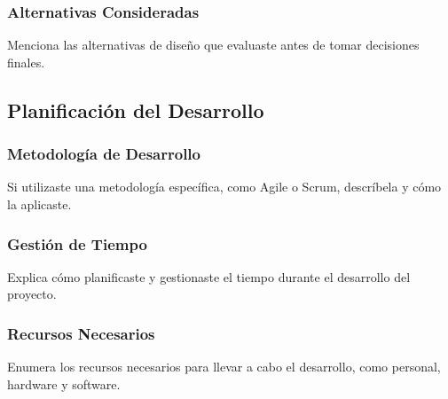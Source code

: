 \subsubsection{Alternativas Consideradas}
Menciona las alternativas de diseño que evaluaste antes de tomar decisiones finales.

\subsection{Planificación del Desarrollo}

\subsubsection{Metodología de Desarrollo}
Si utilizaste una metodología específica, como Agile o Scrum, descríbela y cómo la aplicaste.

\subsubsection{Gestión de Tiempo}
Explica cómo planificaste y gestionaste el tiempo durante el desarrollo del proyecto.

\subsubsection{Recursos Necesarios}
Enumera los recursos necesarios para llevar a cabo el desarrollo, como personal, hardware y software.
